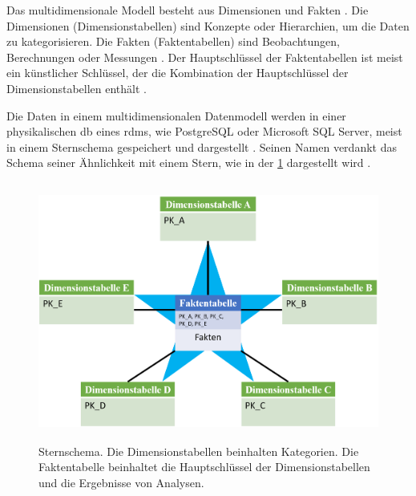 Das multidimensionale Modell besteht aus Dimensionen und Fakten \cite{dworiginal}. Die Dimensionen (Dimensionstabellen) sind Konzepte oder Hierarchien, um die Daten zu kategorisieren. Die Fakten (Faktentabellen) sind Beobachtungen, Berechnungen oder Messungen \cite{dwtool}. Der Hauptschlüssel der Faktentabellen ist meist ein künstlicher Schlüssel, der die Kombination der Hauptschlüssel der Dimensionstabellen enthält \cite{dwbauer, dwtool}. 

Die Daten in einem multidimensionalen Datenmodell werden in einer physikalischen \ac{db} eines \ac{rdms}, wie PostgreSQL oder Microsoft SQL Server, meist in einem Sternschema gespeichert und dargestellt \cite{dworiginal}. Seinen Namen verdankt das Schema seiner Ähnlichkeit mit einem Stern, wie in der \ref{fig:starschema} dargestellt wird \cite{dwtool}.

\clearpage

\begin{figure}[ht]
	\centering
	\includegraphics[height=8.5cm]{figures/starschema}
	\caption[Sternschema]{Sternschema. Die Dimensionstabellen beinhalten Kategorien. Die Faktentabelle beinhaltet die Hauptschlüssel der Dimensionstabellen und die Ergebnisse von Analysen.}
	\label{fig:starschema}
\end{figure}
